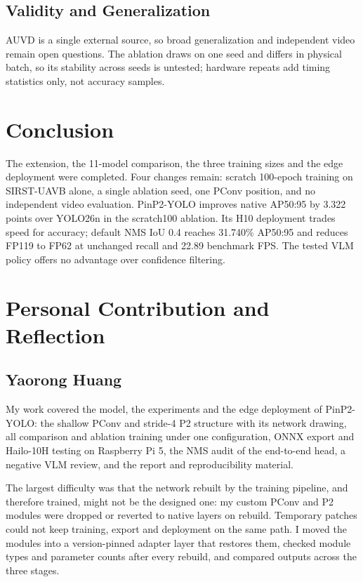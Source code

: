 \documentclass[lettersize,journal]{IEEEtran}
\begin{document}
\subsection{Validity and Generalization}
AUVD is a single external source, so broad generalization and independent video remain open questions. The ablation draws on one seed and differs in physical batch, so its stability across seeds is untested; hardware repeats add timing statistics only, not accuracy samples.

\section{Conclusion}
The extension, the 11-model comparison, the three training sizes and the edge deployment were completed. Four changes remain: scratch 100-epoch training on SIRST-UAVB alone, a single ablation seed, one PConv position, and no independent video evaluation.
PinP2-YOLO improves native AP50:95 by 3.322 points over YOLO26n in the scratch100 ablation. Its H10 deployment trades speed for accuracy; default NMS IoU 0.4 reaches 31.740\% AP50:95 and reduces FP119 to FP62 at unchanged recall and 22.89 benchmark FPS. The tested VLM policy offers no advantage over confidence filtering.



\appendices
\section{Personal Contribution and Reflection}
\subsection{Yaorong Huang}
My work covered the model, the experiments and the edge deployment of PinP2-YOLO: the shallow PConv and stride-4 P2 structure with its network drawing, all comparison and ablation training under one configuration, ONNX export and Hailo-10H testing on Raspberry Pi 5, the NMS audit of the end-to-end head, a negative VLM review, and the report and reproducibility material.

The largest difficulty was that the network rebuilt by the training pipeline, and therefore trained, might not be the designed one: my custom PConv and P2 modules were dropped or reverted to native layers on rebuild. Temporary patches could not keep training, export and deployment on the same path. I moved the modules into a version-pinned adapter layer that restores them, checked module types and parameter counts after every rebuild, and compared outputs across the three stages.
\end{document}
